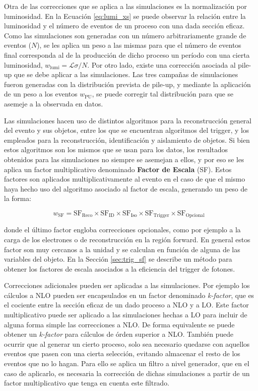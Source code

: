 Otra de las correcciones que se aplica a las simulaciones es la normalización por luminosidad. En la Ecuación \ref{eq:lumi_xs} se puede observar la relación entre la luminosidad y el número de eventos de un proceso con una dada sección eficaz. Como las simulaciones son generadas con un número arbitrariamente grande de eventos ($N$), se les aplica un peso a las mismas para que el número de eventos final corresponda al de la producción de dicho proceso un período con una cierta luminosidad, $w_\text{lumi}=\mathcal{L}\sigma/N$. Por otro lado, existe una corrección asociada al pile-up que se debe aplicar a las simulaciones. Las tres campañas de simulaciones fueron generadas con la distribución prevista de pile-up, y mediante la aplicación de un peso a los eventos $w_\text{PU}$, se puede corregir tal distribución para que se asemeje a la observada en datos.

Las simulaciones hacen uso de distintos algoritmos para la reconstrucción general del evento y sus objetos, entre los que se encuentran algoritmos del trigger, y los empleados para la reconstrucción, identificación y aislamiento de objetos. Si bien estos algoritmos son los mismos que se usan para los datos, los resultados obtenidos para las simulaciones no siempre se asemejan a ellos, y por eso se les aplica un factor multiplicativo denominado \textbf{Factor de Escala} (SF). Estos factores son aplicados multiplicativamente al evento en el caso de que el mismo haya hecho uso del algoritmo asociado al factor de escala, generando un peso de la forma: 

\begin{equation}
  w_{\text{SF}} = \text{SF}_\text{Reco} \times \text{SF}_\text{ID} \times  \text{SF}_\text{Iso} \times  \text{SF}_\text{Trigger} \times  \text{SF}_\text{Opcional}
\end{equation}

\noindent
donde el último factor engloba correcciones opcionales, como por ejemplo a la carga de los electrones o de reconstrucción en la región forward. En general estos factor son muy cercanos a la unidad y se calculan en función de alguna de las variables del objeto. En la Sección \ref{sec:trig_sf} se describe un método para obtener los factores de escala asociados a la eficiencia del trigger de fotones.

Correcciones adicionales pueden ser aplicadas a las simulaciones. Por ejemplo los cálculos a NLO pueden ser encapsulados en un factor denominado \textit{k-factor}, que es el cociente entre la sección eficaz de un dado proceso a NLO y a LO. Este factor multiplicativo puede ser aplicado a las simulaciones hechas a LO para incluir de alguna forma simple las correcciones a NLO. De forma equivalente se puede obtener un \textit{k-factor} para cálculos de órden superior a NLO. También  puede ocurrir que al generar un cierto proceso, solo sea necesario quedarse con aquellos eventos que pasen con una cierta selección, evitando almacenar el resto de los eventos que no lo hagan. Para ello se aplica un filtro a nivel generador, que en el caso de aplicarlo, es necesaria la corrección de dichas simulaciones a partir de un factor multiplicativo que tenga en cuenta este filtrado.

